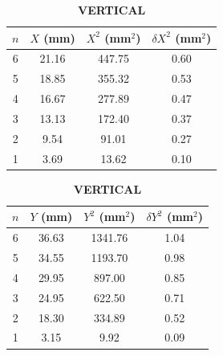 \documentclass[a4paper,11pt]{article}
\begin{document}
\begin{table}[H]
  \centering
  \caption{4 kg — HORIZONTAL (left) and VERTICAL (right)}\label{tab:4kg-hv}
  \begin{subtable}[t]{0.47\linewidth}
    \centering
    \caption*{\textbf{HORIZONTAL}}\label{tab:4kg-h}
    \begin{tabular}{cccc}
      \toprule
      $n$ & $X$ (mm) & $X^2$ (mm$^2$) & $\delta X^2$ (mm$^2$)\\
      \midrule
       6 & 21.16 & 447.75 & 0.60\\
       5 & 18.85 & 355.32 & 0.53\\
       4 & 16.67 & 277.89 & 0.47\\
       3 & 13.13 & 172.40 & 0.37\\
       2 &  9.54 &  91.01 & 0.27\\
       1 &  3.69 &  13.62 & 0.10\\
      \bottomrule
    \end{tabular}
  \end{subtable}
  \hfill
  \begin{subtable}[t]{0.47\linewidth}
    \centering
    \caption*{\textbf{VERTICAL}}\label{tab:4kg-v}
    \begin{tabular}{cccc}
      \toprule
      $n$ & $Y$ (mm) & $Y^2$ (mm$^2$) & $\delta Y^2$ (mm$^2$)\\
      \midrule
       6 & 36.63 & 1341.76 & 1.04\\
       5 & 34.55 & 1193.70 & 0.98\\
       4 & 29.95 &  897.00 & 0.85\\
       3 & 24.95 &  622.50 & 0.71\\
       2 & 18.30 &  334.89 & 0.52\\
       1 &  3.15 &    9.92 & 0.09\\
      \bottomrule
    \end{tabular}
  \end{subtable}
\end{table}
\end{document}
